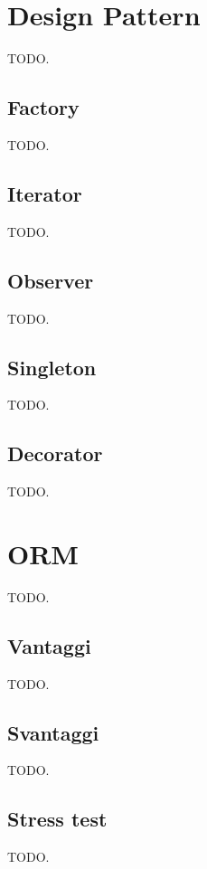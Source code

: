 \documentclass{article}
\begin{document}
\section{Design Pattern}

TODO.

\subsection{Factory}

TODO.

\subsection{Iterator}

TODO.

\subsection{Observer}

TODO.

\subsection{Singleton}

TODO.

\subsection{Decorator}

TODO.

\section{ORM}

TODO.

\subsection{Vantaggi}

TODO.

\subsection{Svantaggi}

TODO.

\subsection{Stress test}

TODO.

\begin{appendix}
    \listoffigures
\end{appendix}
\end{document}
